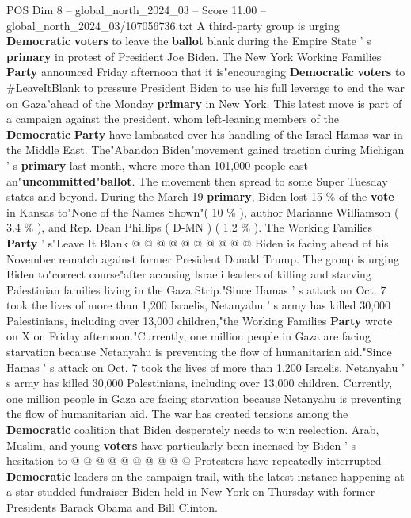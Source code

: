 \begin{textsample}{POS Dim 8 – global\_north\_2024\_03 – Score 11.00 – global\_north\_2024\_03/107056736.txt}  \label{ex:f8_pos_012}
A third-party group is urging \textbf{Democratic} \textbf{voters} to leave the \textbf{ballot} blank during the Empire State ' s \textbf{primary} in protest of President Joe Biden.
The New York Working Families \textbf{Party} announced Friday afternoon that it is"encouraging \textbf{Democratic} \textbf{voters} to \#LeaveItBlank to pressure President Biden to use his full leverage to end the war on Gaza"ahead of the Monday \textbf{primary} in New York.
This latest move is part of a campaign against the president, whom left-leaning members of the \textbf{Democratic} \textbf{Party} have lambasted over his handling of the Israel-Hamas war in the Middle East.
The"Abandon Biden"movement gained traction during Michigan ' s \textbf{primary} last month, where more than 101,000 people cast an"\textbf{uncommitted}"\textbf{ballot}.
The movement then spread to some Super Tuesday states and beyond.
During the March 19 \textbf{primary}, Biden lost 15 \% of the \textbf{vote} in Kansas to"None of the Names Shown"( 10 \% ), author Marianne Williamson ( 3.4 \% ), and Rep.
Dean Phillips ( D-MN ) ( 1.2 \% ).
The Working Families \textbf{Party} ' s"Leave It Blank @ @ @ @ @ @ @ @ @ @ Biden is facing ahead of his November rematch against former President Donald Trump.
The group is urging Biden to"correct course"after accusing Israeli leaders of killing and starving Palestinian families living in the Gaza Strip."Since Hamas ' s attack on Oct. 7 took the lives of more than 1,200 Israelis, Netanyahu ' s army has killed 30,000 Palestinians, including over 13,000 children,"the Working Families \textbf{Party} wrote on X on Friday afternoon."Currently, one million people in Gaza are facing starvation because Netanyahu is preventing the flow of humanitarian aid."Since Hamas ' s attack on Oct. 7 took the lives of more than 1,200 Israelis, Netanyahu ' s army has killed 30,000 Palestinians, including over 13,000 children.
Currently, one million people in Gaza are facing starvation because Netanyahu is preventing the flow of humanitarian aid.
The war has created tensions among the \textbf{Democratic} coalition that Biden desperately needs to win reelection.
Arab, Muslim, and young \textbf{voters} have particularly been incensed by Biden ' s hesitation to @ @ @ @ @ @ @ @ @ @ Protesters have repeatedly interrupted \textbf{Democratic} leaders on the campaign trail, with the latest instance happening at a star-studded fundraiser Biden held in New York on Thursday with former Presidents Barack Obama and Bill Clinton.

\end{textsample}

